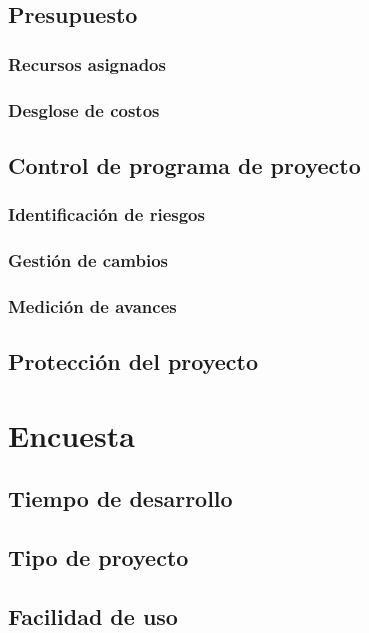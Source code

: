 \documentclass[]{article}
\begin{document}
\subsection{Presupuesto}
\subsubsection{Recursos asignados}
\subsubsection{Desglose de costos}

\subsection{Control de programa de proyecto}
\subsubsection{Identificaci\'on de riesgos}
\subsubsection{Gesti\'on de cambios}
\subsubsection{Medici\'on de avances}

\subsection{Protecci\'on del proyecto}

\section{Encuesta}
\subsection{Tiempo de desarrollo}
\subsection{Tipo de proyecto}
\subsection{Facilidad de uso}

\newpage


\end{document}
